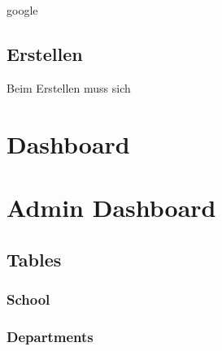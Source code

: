 \begin{inhalt}
google



\subsection{Erstellen}

Beim Erstellen muss sich 















\newpage

\section{Dashboard}

\newpage































\newpage

\section{Admin Dashboard}



\subsection{Tables}

\subsubsection{School}

\subsubsection{Departments}


\end{inhalt}

